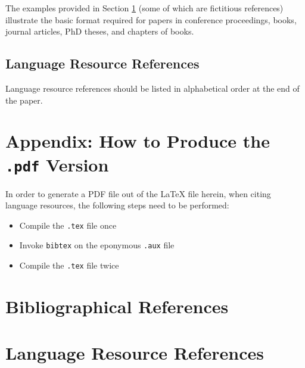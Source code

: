 \documentclass[10pt, a4paper]{article}
\begin{document}
The examples provided in Section \ref{reference} (some of which are fictitious
references) illustrate the basic format required for papers in conference
proceedings, books, journal articles, PhD theses, and chapters of books.

\subsection{Language Resource References}

Language resource references should be listed in alphabetical order at the end
of the paper.

\section*{Appendix: How to Produce the \texttt{.pdf} Version}

In order to generate a PDF file out of the LaTeX file herein, when citing
language resources, the following steps need to be performed:

\begin{itemize}
    \item{Compile the \texttt{.tex} file once}
    \item{Invoke \texttt{bibtex} on the eponymous \texttt{.aux} file}
    \item{Compile the \texttt{.tex} file twice}
\end{itemize}

\section{Bibliographical References}\label{reference}




\section{Language Resource References}
\label{lr:ref}
\end{document}
